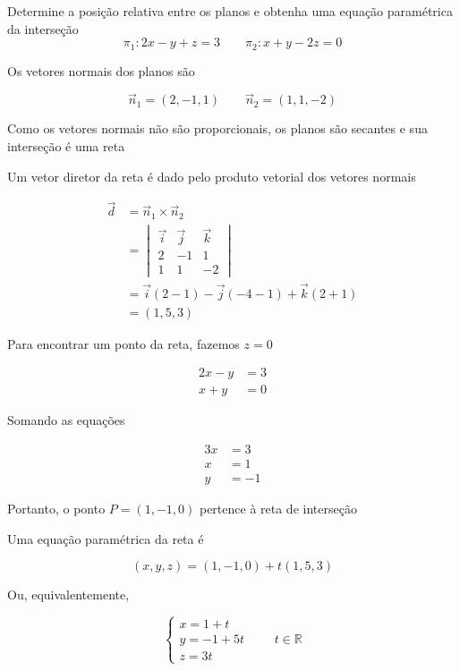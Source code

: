 \documentclass[a4paper,12pt,fleqn]{article}
\begin{document}
Determine a posição relativa entre os planos e obtenha uma equação paramétrica
da interseção
\[
  \pi_1\colon 2x-y+z=3
  \qquad
  \pi_2\colon x+y-2z=0
\]

\begin{answer}
  Os vetores normais dos planos são

  \[
    \vec{n}_1=(2,-1,1)
    \qquad
    \vec{n}_2=(1,1,-2)
  \]

  Como os vetores normais não são proporcionais, os planos são secantes
  e sua interseção é uma reta

  Um vetor diretor da reta é dado pelo produto vetorial dos vetores normais

  \begin{align*}
    \vec{d}
    & = \vec{n}_1\times\vec{n}_2
    \\
    & = \begin{vmatrix}
          \vec{i} & \vec{j} & \vec{k} \\
          2       & -1      & 1       \\
          1       & 1       & -2
        \end{vmatrix}
    \\
    & = \vec{i}(2-1)
      -\vec{j}(-4-1)
      +\vec{k}(2+1)
    \\
    & = (1,5,3)
  \end{align*}

  Para encontrar um ponto da reta, fazemos $z=0$

  \begin{align*}
    2x-y&=3
    \\
    x+y&=0
  \end{align*}

  Somando as equações

  \begin{align*}
    3x&=3
    \\
    x&=1
    \\
    y&=-1
  \end{align*}

  Portanto, o ponto $P=(1,-1,0)$ pertence à reta de interseção

  Uma equação paramétrica da reta é

  \[
    (x,y,z)=(1,-1,0)+t(1,5,3)
  \]

  Ou, equivalentemente,

  \[
    \begin{cases}
      x=1+t\\
      y=-1+5t\\
      z=3t
    \end{cases}
    \qquad t\in\mathbb{R}
  \]
\end{answer}
\end{document}
